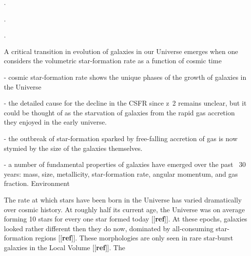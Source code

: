 \documentclass[oneside,11pt]{amsart}
\newcommand{\comment}[2][todo]{{\color{#1}[[{\bf #2}]]}}
\begin{document}
\medskip
{}.

\medskip
{}.


\medskip
{}.









A critical transition in evolution of galaxies in our Universe emerges when one considers the volumetric star-formation rate as a function of cosmic time 

 - cosmic star-formation rate shows the unique phases of the growth of
   galaxies in the Universe

 - the detailed cause for the decline in the CSFR since z~2 remains
   unclear, but it could be thought of as the starvation of galaxies
   from the rapid gas accretion they enjoyed in the early universe.

 - the outbreak of star-formation sparked by free-falling accretion of
   gas is now stymied by the size of the galaxies themselves.

 - a number of fundamental properties of galaxies have emerged over the
   past ~30 years: mass, size, metallicity, star-formation rate, angular
   momentum, and gas fraction.  Environment


The rate at which stars have been born in the Universe has varied
dramatically over cosmic history.  At roughly half its current age, the
Universe was on average forming 10 stars for every one star formed today
\comment{ref}.  At these epochs, galaxies looked rather different then
they do now, dominated by all-consuming star-formation regions
\comment{ref}.  These morphologies are only seen in rare star-burst
galaxies in the Local Volume \comment{ref}.  The 
\end{document}
